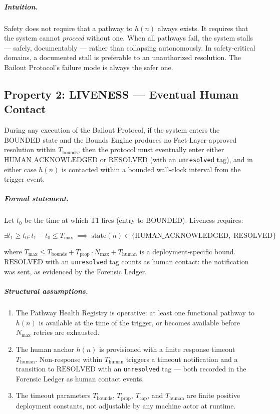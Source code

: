 \subparagraph{Intuition.} Safety does not require that a pathway to $h(n)$ always exists. It requires that the system cannot \emph{proceed} without one. When all pathways fail, the system stalls — safely, documentably — rather than collapsing autonomously. In safety-critical domains, a documented stall is preferable to an unauthorized resolution. The Bailout Protocol's failure mode is always the safer one.

\subsection{Property 2: LIVENESS — Eventual Human Contact}

\begin{theorem}\label{thm:liveness}
During any execution of the Bailout Protocol, if the system enters the $\text{BOUNDED}$ state and the Bounds Engine produces no Fact-Layer-approved resolution within $T_{\text{bounds}}$, then the protocol must eventually enter either $\text{HUMAN\_ACKNOWLEDGED}$ or $\text{RESOLVED}$ (with an \texttt{unresolved} tag), and in either case $h(n)$ is contacted within a bounded wall-clock interval from the trigger event.
\end{theorem}

\subparagraph{Formal statement.} Let $t_0$ be the time at which T1 fires (entry to $\text{BOUNDED}$). Liveness requires:

\begin{equation}
\exists t_1 \geq t_0 : t_1 - t_0 \leq T_{\max}
\;\implies\;
\text{state}(n) \in \{\text{HUMAN\_ACKNOWLEDGED},\; \text{RESOLVED}\}
\end{equation}

where $T_{\max} \leq T_{\text{bounds}} + T_{\text{prop}} \cdot N_{\max} + T_{\text{human}}$ is a deployment-specific bound. $\text{RESOLVED}$ with an \texttt{unresolved} tag counts as human contact: the notification was sent, as evidenced by the Forensic Ledger.

\subparagraph{Structural assumptions.}
\begin{enumerate}
\item[\textbf{A2.1}] The Pathway Health Registry is operative: at least one functional pathway to $h(n)$ is available at the time of the trigger, or becomes available before $N_{\max}$ retries are exhausted.
\item[\textbf{A2.2}] The human anchor $h(n)$ is provisioned with a finite response timeout $T_{\text{human}}$. Non-response within $T_{\text{human}}$ triggers a timeout notification and a transition to $\text{RESOLVED}$ with an \texttt{unresolved} tag — both recorded in the Forensic Ledger as human contact events.
\item[\textbf{A2.3}] The timeout parameters $T_{\text{bounds}}$, $T_{\text{prop}}$, $T_{\text{cap}}$, and $T_{\text{human}}$ are finite positive deployment constants, not adjustable by any machine actor at runtime.
\end{enumerate}

